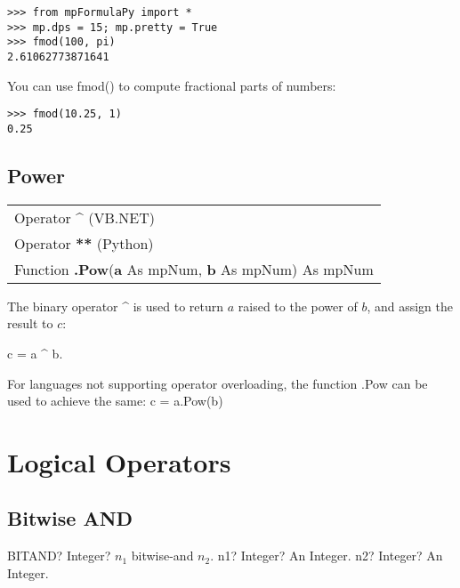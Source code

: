 \begin{lstlisting}
>>> from mpFormulaPy import *
>>> mp.dps = 15; mp.pretty = True
>>> fmod(100, pi)
2.61062773871641
\end{lstlisting}


You can use fmod() to compute fractional parts of numbers:

\begin{lstlisting}
>>> fmod(10.25, 1)
0.25
\end{lstlisting}




\subsection{Power}
\begin{tabular}{p{481pt}}
	\toprule
	\textsf{Operator \textbf{\^}} (VB.NET)\index{Multiprecision Functions!\^} \\
	\textsf{Operator \textbf{**}} (Python) \index{Multiprecision Functions!\^} \\
	\midrule
	\textsf{Function \textbf{.Pow}(\textbf{a} As mpNum, \textbf{b} As mpNum) As mpNum}\index{Multiprecision Functions!.Pow} \\
	\bottomrule
\end{tabular}

\vspace{0.3cm}
The binary operator \textsf{\^} is used to return $a$ raised to the power of $b$, and assign the result to $c$:

\textsf{c = a} \textsf{\^} \textsf{b}.

For languages not supporting operator overloading, the function \textsf{.Pow} can be used to achieve the same: \textsf{c = a.Pow(b)}






\newpage
\section{Logical Operators }
\label{LogicalOperatorsInt}



\subsection{Bitwise AND}


\vspace{0.6cm}
\begin{mpFunctionsExtract}
	\mpWorksheetFunctionTwoNotImplemented
	{BITAND? Integer? $n_1$ bitwise-and $n_2$.}
	{n1? Integer? An Integer.}
	{n2? Integer? An Integer.}
\end{mpFunctionsExtract}





